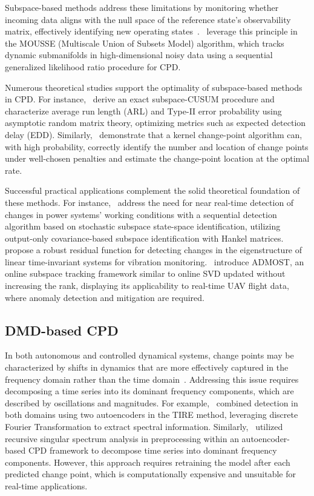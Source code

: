 Subspace-based methods address these limitations by monitoring whether incoming data aligns with the null space of the reference state's observability matrix, effectively identifying new operating states~\cite{Dohler2013, Ye2023}.\ \cite{Xie2013} leverage this principle in the MOUSSE (Multiscale Union of Subsets Model) algorithm, which tracks dynamic submanifolds in high-dimensional noisy data using a sequential generalized likelihood ratio procedure for CPD\@.

Numerous theoretical studies support the optimality of subspace-based methods in CPD\@. For instance,~\cite{Ye2023} derive an exact subspace-CUSUM procedure and characterize average run length (ARL) and Type-II error probability using asymptotic random matrix theory, optimizing metrics such as expected detection delay (EDD). Similarly,~\cite{Garreau2018} demonstrate that a kernel change-point algorithm can, with high probability, correctly identify the number and location of change points under well-chosen penalties and estimate the change-point location at the optimal rate.

Successful practical applications complement the solid theoretical foundation of these methods. For instance,~\cite{Hosur2019} address the need for near real-time detection of changes in power systems' working conditions with a sequential detection algorithm based on stochastic subspace state-space identification, utilizing output-only covariance-based subspace identification with Hankel matrices.\ \cite{Dohler2013} propose a robust residual function for detecting changes in the eigenstructure of linear time-invariant systems for vibration monitoring.\ \cite{He2019} introduce ADMOST, an online subspace tracking framework similar to online SVD updated without increasing the rank, displaying its applicability to real-time UAV flight data, where anomaly detection and mitigation are required.

\subsection{DMD-based CPD}
In both autonomous and controlled dynamical systems, change points may be characterized by shifts in dynamics that are more effectively captured in the frequency domain rather than the time domain~\cite{DeRyck2021, Gupta2022}. Addressing this issue requires decomposing a time series into its dominant frequency components, which are described by oscillations and magnitudes. For example,~\cite{DeRyck2021} combined detection in both domains using two autoencoders in the TIRE method, leveraging discrete Fourier Transformation to extract spectral information. Similarly,~\cite{Gupta2022} utilized recursive singular spectrum analysis in preprocessing within an autoencoder-based CPD framework to decompose time series into dominant frequency components. However, this approach requires retraining the model after each predicted change point, which is computationally expensive and unsuitable for real-time applications.

